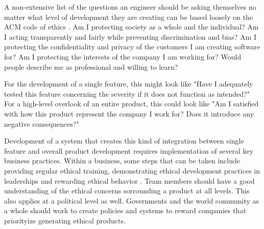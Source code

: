 \documentclass{assignment-x}
\begin{document}
A non-extensive list of the questions an engineer should be asking themselves no matter what level of development they are creating can be based loosely on the ACM code of ethics \cite{ACMCodeOfEthics}. Am I protecting society as a whole and the individual? Am I acting transparently and fairly while preventing discrimination and bias? Am I protecting the confidentiality and privacy of the customers I am creating software for? Am I protecting the interests of the company I am working for? Would people describe me as professional and willing to learn?

For the development of a single feature, this might look like "Have I adequately tested this feature concerning the severity if it does not function as intended?" For a high-level overlook of an entire product, this could look like "Am I satisfied with how this product represent the company I work for? Does it introduce any negative consequences?"

Development of a system that creates this kind of integration between single feature and overall product development requires implementation of several key business practices. Within a business, some steps that can be taken include providing regular ethical training, demonstrating ethical development practices in leaderships and rewarding ethical behavior \cite{boisestate_ethical_business_practices}. Team members should have a good understanding of the ethical concerns sorrounding a product at all levels. This also applies at a political level as well. Governments and the world community as a whole should work to create policies and systems to reward companies that priorityize generating ethical products.

\pagebreak


\end{document}
